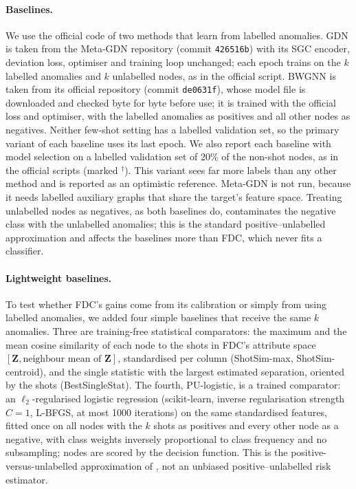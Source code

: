 \documentclass[pdflatex,sn-mathphys-ay]{sn-jnl}
\theoremstyle{plain}
\theoremstyle{remark}
\begin{document}
\paragraph{Baselines.} We use the official code of two methods that learn from labelled anomalies. GDN \citep{ding2021few} is taken from the Meta-GDN repository (commit \texttt{426516b}) with its SGC encoder, deviation loss, optimiser and training loop unchanged; each epoch trains on the $k$ labelled anomalies and $k$ unlabelled nodes, as in the official script. BWGNN \citep{tang2022rethinking} is taken from its official repository (commit \texttt{de0631f}), whose model file is downloaded and checked byte for byte before use; it is trained with the official loss and optimiser, with the labelled anomalies as positives and all other nodes as negatives. Neither few-shot setting has a labelled validation set, so the primary variant of each baseline uses its last epoch. We also report each baseline with model selection on a labelled validation set of 20\% of the non-shot nodes, as in the official scripts (marked $^{\dagger}$). This variant sees far more labels than any other method and is reported as an optimistic reference. Meta-GDN is not run, because it needs labelled auxiliary graphs that share the target's feature space. Treating unlabelled nodes as negatives, as both baselines do, contaminates the negative class with the unlabelled anomalies; this is the standard positive--unlabelled approximation \citep{elkan2008learning,bekker2020learning} and affects the baselines more than FDC, which never fits a classifier.

\paragraph{Lightweight baselines.} To test whether FDC's gains come from its calibration or simply from using labelled anomalies, we added four simple baselines that receive the same $k$ anomalies. Three are training-free statistical comparators: the maximum and the mean cosine similarity of each node to the shots in FDC's attribute space $[\mathbf{Z}, \text{neighbour mean of }\mathbf{Z}]$, standardised per column (ShotSim-max, ShotSim-centroid), and the single statistic with the largest estimated separation, oriented by the shots (BestSingleStat). The fourth, PU-logistic, is a trained comparator: an $\ell_2$-regularised logistic regression (scikit-learn, inverse regularisation strength $C=1$, L-BFGS, at most 1000 iterations) on the same standardised features, fitted once on all nodes with the $k$ shots as positives and every other node as a negative, with class weights inversely proportional to class frequency and no subsampling; nodes are scored by the decision function. This is the positive-versus-unlabelled approximation of \citet{elkan2008learning}, not an unbiased positive--unlabelled risk estimator.
\end{document}

